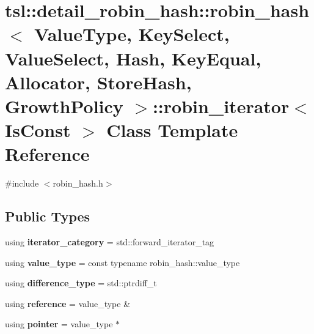 \hypertarget{classtsl_1_1detail__robin__hash_1_1robin__hash_1_1robin__iterator}{}\section{tsl\+::detail\+\_\+robin\+\_\+hash\+::robin\+\_\+hash$<$ Value\+Type, Key\+Select, Value\+Select, Hash, Key\+Equal, Allocator, Store\+Hash, Growth\+Policy $>$\+::robin\+\_\+iterator$<$ Is\+Const $>$ Class Template Reference}
\label{classtsl_1_1detail__robin__hash_1_1robin__hash_1_1robin__iterator}


{\ttfamily \#include $<$robin\+\_\+hash.\+h$>$}

\subsection*{Public Types}
\begin{DoxyCompactItemize}
\item 
\mbox{\label{classtsl_1_1detail__robin__hash_1_1robin__hash_1_1robin__iterator_a9da421ec9a856cd89fc69541c7a2393d}} 
using {\bfseries iterator\+\_\+category} = std\+::forward\+\_\+iterator\+\_\+tag
\item 
\mbox{\label{classtsl_1_1detail__robin__hash_1_1robin__hash_1_1robin__iterator_a6060ff62e056e8c5a1b2e2a355f135b9}} 
using {\bfseries value\+\_\+type} = const typename robin\+\_\+hash\+::value\+\_\+type
\item 
\mbox{\label{classtsl_1_1detail__robin__hash_1_1robin__hash_1_1robin__iterator_abfec9c200a64d8cd148b00013c678045}} 
using {\bfseries difference\+\_\+type} = std\+::ptrdiff\+\_\+t
\item 
\mbox{\label{classtsl_1_1detail__robin__hash_1_1robin__hash_1_1robin__iterator_a316d2ecc600f2e7a971f634ffd9746d0}} 
using {\bfseries reference} = value\+\_\+type \&
\item 
\mbox{\label{classtsl_1_1detail__robin__hash_1_1robin__hash_1_1robin__iterator_adf5aea911258759be15de8dacee57bab}} 
using {\bfseries pointer} = value\+\_\+type $\ast$
\end{DoxyCompactItemize}
